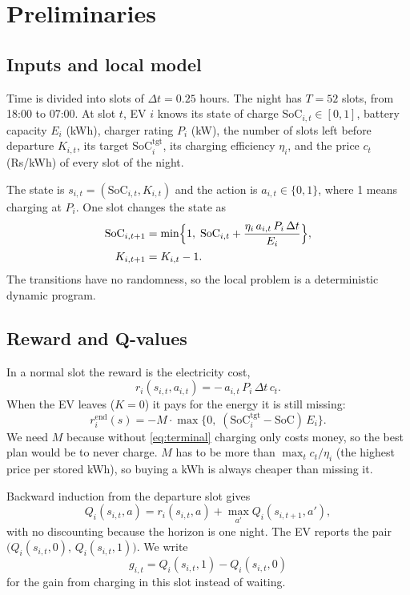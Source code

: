 \documentclass{article}
\newcommand{\soc}{\mathrm{SoC}}
\newcommand{\dt}{\Delta t}
\begin{document}
\section{Preliminaries}

\subsection{Inputs and local model}

Time is divided into slots of $\dt = 0.25$ hours. The night has $T = 52$ slots, from 18:00 to 07:00. At slot $t$, EV $i$ knows its state of charge $\soc_{i,t} \in [0,1]$, battery capacity $E_i$ (kWh), charger rating $P_i$ (kW), the number of slots left before departure $K_{i,t}$, its target $\soc^{\mathrm{tgt}}_i$, its charging efficiency $\eta_i$, and the price $c_t$ (Rs/kWh) of every slot of the night.

The state is $s_{i,t} = (\soc_{i,t}, K_{i,t})$ and the action is $a_{i,t} \in \{0,1\}$, where 1 means charging at $P_i$. One slot changes the state as
\begin{align}
\soc_{i,t+1} &= \min\Bigl\{1,\; \soc_{i,t} + \frac{\eta_i\, a_{i,t}\, P_i\, \dt}{E_i}\Bigr\}, \\
K_{i,t+1} &= K_{i,t} - 1.
\end{align}
The transitions have no randomness, so the local problem is a deterministic dynamic program.

\subsection{Reward and Q-values}

In a normal slot the reward is the electricity cost,
\begin{equation}
r_i(s_{i,t}, a_{i,t}) = -\,a_{i,t}\, P_i\, \dt\, c_t .
\end{equation}
When the EV leaves ($K = 0$) it pays for the energy it is still missing:
\begin{equation}
r_i^{\mathrm{end}}(s) = -M \cdot \max\bigl\{0,\; (\soc^{\mathrm{tgt}}_i - \soc)\, E_i\bigr\}.
\label{eq:terminal}
\end{equation}
We need $M$ because without \eqref{eq:terminal} charging only costs money, so the best plan would be to never charge. $M$ has to be more than $\max_t c_t / \eta_i$ (the highest price per stored kWh), so buying a kWh is always cheaper than missing it.

Backward induction from the departure slot gives
\begin{equation}
Q_i(s_{i,t}, a) = r_i(s_{i,t}, a) + \max_{a'} Q_i(s_{i,t+1}, a'),
\end{equation}
with no discounting because the horizon is one night. The EV reports the pair $\bigl(Q_i(s_{i,t},0),\, Q_i(s_{i,t},1)\bigr)$. We write
\begin{equation}
g_{i,t} = Q_i(s_{i,t},1) - Q_i(s_{i,t},0)
\end{equation}
for the gain from charging in this slot instead of waiting.
\end{document}

